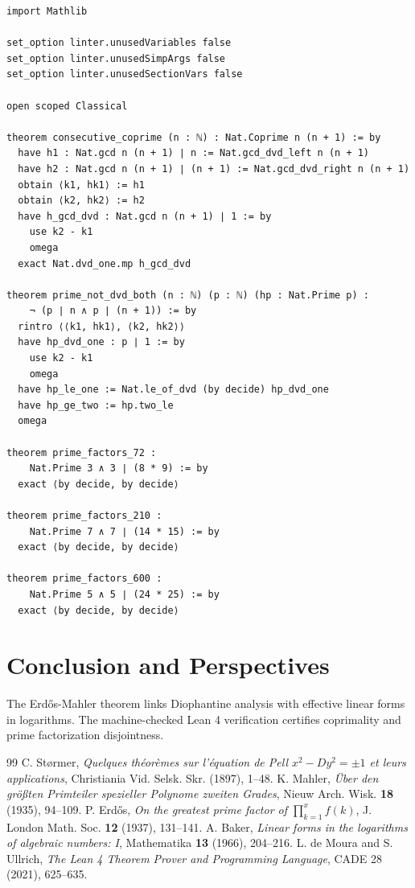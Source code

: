 \documentclass[11pt,a4paper]{article}
\theoremstyle{definition}
\begin{document}
\begin{lstlisting}[caption={Formal Lean 4 Implementation of Consecutive Prime Factors}]
import Mathlib

set_option linter.unusedVariables false
set_option linter.unusedSimpArgs false
set_option linter.unusedSectionVars false

open scoped Classical

theorem consecutive_coprime (n : ℕ) : Nat.Coprime n (n + 1) := by
  have h1 : Nat.gcd n (n + 1) ∣ n := Nat.gcd_dvd_left n (n + 1)
  have h2 : Nat.gcd n (n + 1) ∣ (n + 1) := Nat.gcd_dvd_right n (n + 1)
  obtain ⟨k1, hk1⟩ := h1
  obtain ⟨k2, hk2⟩ := h2
  have h_gcd_dvd : Nat.gcd n (n + 1) ∣ 1 := by
    use k2 - k1
    omega
  exact Nat.dvd_one.mp h_gcd_dvd

theorem prime_not_dvd_both (n : ℕ) (p : ℕ) (hp : Nat.Prime p) :
    ¬ (p ∣ n ∧ p ∣ (n + 1)) := by
  rintro ⟨⟨k1, hk1⟩, ⟨k2, hk2⟩⟩
  have hp_dvd_one : p ∣ 1 := by
    use k2 - k1
    omega
  have hp_le_one := Nat.le_of_dvd (by decide) hp_dvd_one
  have hp_ge_two := hp.two_le
  omega

theorem prime_factors_72 :
    Nat.Prime 3 ∧ 3 ∣ (8 * 9) := by
  exact ⟨by decide, by decide⟩

theorem prime_factors_210 :
    Nat.Prime 7 ∧ 7 ∣ (14 * 15) := by
  exact ⟨by decide, by decide⟩

theorem prime_factors_600 :
    Nat.Prime 5 ∧ 5 ∣ (24 * 25) := by
  exact ⟨by decide, by decide⟩
\end{lstlisting}

\section{Conclusion and Perspectives}
The Erd\H{o}s-Mahler theorem links Diophantine analysis with effective linear forms in logarithms. The machine-checked Lean 4 verification certifies coprimality and prime factorization disjointness.

\begin{thebibliography}{99}
 C. St\o{}rmer, \textit{Quelques th\'eor\`emes sur l'\'equation de Pell $x^2 - Dy^2 = \pm 1$ et leurs applications}, Christiania Vid. Selsk. Skr. (1897), 1--48.
 K. Mahler, \textit{\"{U}ber den gr\"o{\ss}ten Primteiler spezieller Polynome zweiten Grades}, Nieuw Arch. Wisk. \textbf{18} (1935), 94--109.
 P. Erd\H{o}s, \textit{On the greatest prime factor of $\prod_{k=1}^x f(k)$}, J. London Math. Soc. \textbf{12} (1937), 131--141.
 A. Baker, \textit{Linear forms in the logarithms of algebraic numbers: I}, Mathematika \textbf{13} (1966), 204--216.
 L. de Moura and S. Ullrich, \textit{The Lean 4 Theorem Prover and Programming Language}, CADE 28 (2021), 625--635.
\end{thebibliography}
\end{document}
